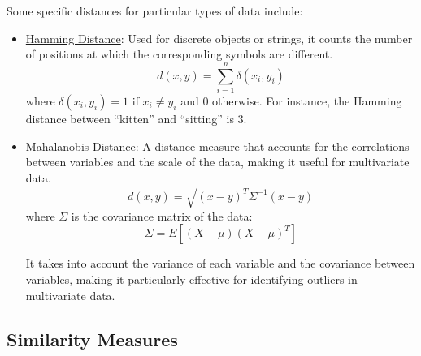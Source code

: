 Some specific distances for particular types of data include:
\begin{itemize}
    \item \ul{Hamming Distance}: Used for discrete objects or strings, it counts the number of positions at which the corresponding symbols are different.
    \begin{equation*}
        d(x, y) = \sum_{i=1}^{n} \delta(x_i, y_i)
    \end{equation*}
    where $\delta(x_i, y_i) = 1$ if $x_i \neq y_i$ and $0$ otherwise. For instance, the Hamming distance between ``kitten'' and ``sitting'' is 3.

    \item \ul{Mahalanobis Distance}: A distance measure that accounts for the correlations between variables and the scale of the data, making it useful for multivariate data.
    \begin{equation*}
        d(x, y) = \sqrt{(x - y)^T \Sigma^{-1} (x - y)}
    \end{equation*}
    where $\Sigma$ is the covariance matrix of the data:
    \begin{equation*}
        \Sigma = E[(X - \mu)(X - \mu)^T]
    \end{equation*}

    It takes into account the variance of each variable and the covariance between variables, making it particularly effective for identifying outliers in multivariate data.
\end{itemize}

\subsection{Similarity Measures}

